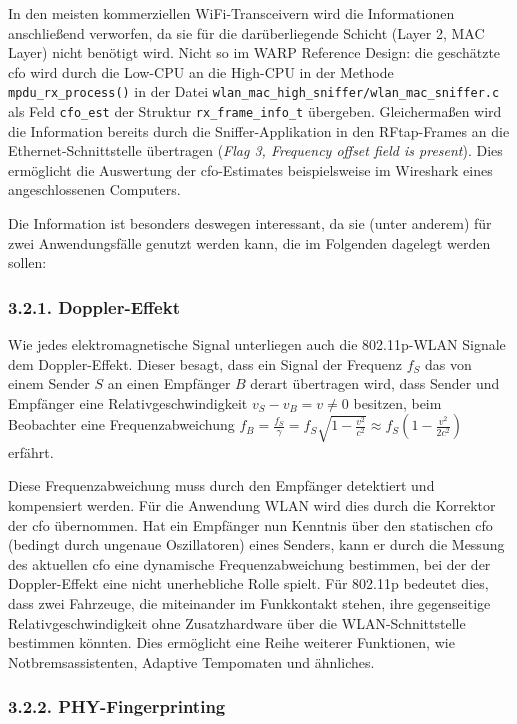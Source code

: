\documentclass[ngerman,]{scrartcl}
\begin{document}
In den meisten kommerziellen WiFi-Transceivern wird die Informationen
anschließend verworfen, da sie für die darüberliegende Schicht (Layer 2,
MAC Layer) nicht benötigt wird. Nicht so im WARP Reference Design: die
geschätzte \ac{cfo} wird durch die Low-CPU an die High-CPU in der
Methode \texttt{mpdu\_rx\_process()} in der Datei
\texttt{wlan\_mac\_high\_sniffer/wlan\_mac\_sniffer.c} als Feld
\texttt{cfo\_est} der Struktur \texttt{rx\_frame\_info\_t} übergeben.
Gleichermaßen wird die Information bereits durch die Sniffer-Applikation
in den RFtap-Frames an die Ethernet-Schnittstelle übertragen (\emph{Flag
3, Frequency offset field is present}). Dies ermöglicht die Auswertung
der \ac{cfo}-Estimates beispielsweise im Wireshark eines angeschlossenen
Computers.

Die Information ist besonders deswegen interessant, da sie (unter
anderem) für zwei Anwendungsfälle genutzt werden kann, die im Folgenden
dagelegt werden sollen:

\subsubsection{3.2.1. Doppler-Effekt}\label{doppler-effekt}

Wie jedes elektromagnetische Signal unterliegen auch die 802.11p-WLAN
Signale dem Doppler-Effekt. Dieser besagt, dass ein Signal der Frequenz
\(f_S\) das von einem Sender \(S\) an einen Empfänger \(B\) derart
übertragen wird, dass Sender und Empfänger eine Relativgeschwindigkeit
\(v_S - v_B = v \neq 0\) besitzen, beim Beobachter eine
Frequenzabweichung
\(f_{B} = \frac{f_{S}}{\gamma} = f_{S} \sqrt{1-\frac{v^2}{c^2}} \approx f_{S} \left(1 - \frac{v^2}{2c^2}\right)\)
erfährt.

Diese Frequenzabweichung muss durch den Empfänger detektiert und
kompensiert werden. Für die Anwendung WLAN wird dies durch die Korrektor
der \ac{cfo} übernommen. Hat ein Empfänger nun Kenntnis über den
statischen \ac{cfo} (bedingt durch ungenaue Oszillatoren) eines Senders,
kann er durch die Messung des aktuellen \ac{cfo} eine dynamische
Frequenzabweichung bestimmen, bei der der Doppler-Effekt eine nicht
unerhebliche Rolle spielt. Für 802.11p bedeutet dies, dass zwei
Fahrzeuge, die miteinander im Funkkontakt stehen, ihre gegenseitige
Relativgeschwindigkeit ohne Zusatzhardware über die WLAN-Schnittstelle
bestimmen könnten. Dies ermöglicht eine Reihe weiterer Funktionen, wie
Notbremsassistenten, Adaptive Tempomaten und ähnliches.

\subsubsection{3.2.2. PHY-Fingerprinting}\label{phy-fingerprinting}
\end{document}
